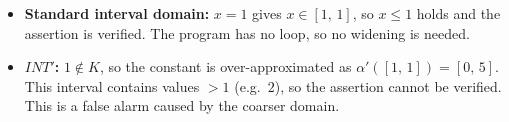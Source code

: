\documentclass[11pt,a4paper]{article}
\newcommand{\itv}[2]{[#1,\,#2]}
\newcommand{\INTp}{\mathit{INT}'}
\begin{document}
\begin{itemize}
  \item \textbf{Standard interval domain:} $x = 1$ gives $x \in \itv{1}{1}$, so $x \le 1$
        holds and the assertion is verified. The program has no loop, so no widening is needed.
  \item \textbf{$\INTp$:} $1 \notin K$, so the constant is over-approximated as
        $\alpha'(\itv{1}{1}) = \itv{0}{5}$. This interval contains values $> 1$ (e.g.\ $2$),
        so the assertion cannot be verified. This is a false alarm caused by the coarser
        domain.
\end{itemize}
\end{document}
